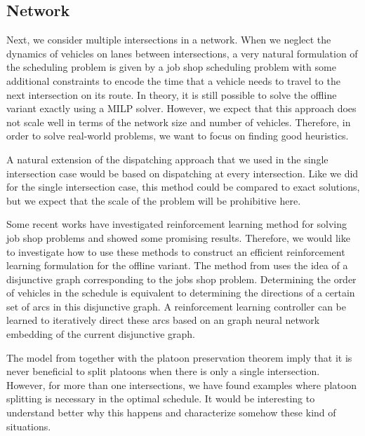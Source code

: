 \documentclass{article}
\theoremstyle{definition}
\theoremstyle{plain}
\begin{document}
\subsection{Network}


Next, we consider multiple intersections in a network. When we neglect the
dynamics of vehicles on lanes between intersections, a very natural formulation
of the scheduling problem is given by a job shop \cite{pinedoSchedulingTheoryAlgorithms2016} scheduling
problem with some additional constraints to encode the time that a vehicle needs
to travel to the next intersection on its route. In theory, it is still possible
to solve the offline variant exactly using a MILP solver. However, we expect
that this approach does not scale well in terms of the network size and number
of vehicles. Therefore, in order to solve real-world problems, we want to focus
on finding good heuristics.


A natural extension of the dispatching approach that we used in the single
intersection case would be based on dispatching at every intersection. Like we
did for the single intersection case, this method could be compared to exact
solutions, but we expect that the scale of the problem will be prohibitive here.


Some recent works
\cite{zhangLearningDispatchJob2020,tasselReinforcementLearningEnvironment2021}
have investigated reinforcement learning method for solving job shop problems
and showed some promising results. Therefore, we would like to investigate how
to use these methods to construct an efficient reinforcement learning
formulation for the offline variant. The method from
\cite{zhangLearningDispatchJob2020} uses the idea of a disjunctive graph
corresponding to the jobs shop problem. Determining the order of vehicles in the
schedule is equivalent to determining the directions of a certain set of arcs in
this disjunctive graph. A reinforcement learning controller can be learned to
iteratively direct these arcs based on an graph neural network embedding of the
current disjunctive graph.


The model from \cite{timmermanPlatoonFormingAlgorithms2021} together with the
platoon preservation theorem \cite{limpensOnlinePlatoonForming2023} imply that
it is never beneficial to split platoons when there is only a single
intersection. However, for more than one intersections, we have found examples
where platoon splitting is necessary in the optimal schedule. It would be
interesting to understand better why this happens and characterize somehow these
kind of situations.
\end{document}
